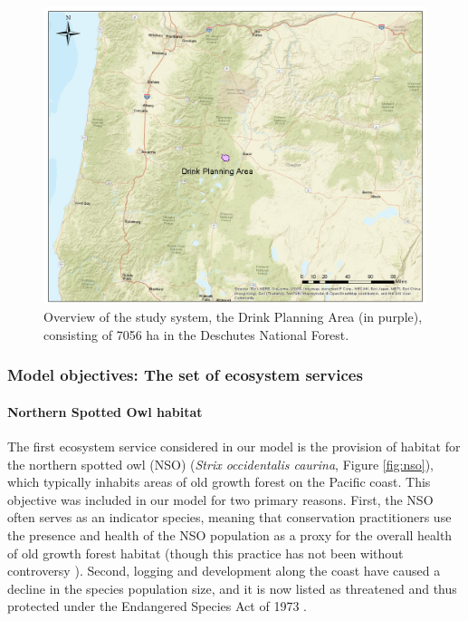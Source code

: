 \begin{figure}[ht]
\centering
\includegraphics[width=.85\textwidth]{../images/DrinkMap_Overview}
\caption[Overview of the study system, the Drink Planning Area]{Overview of the study system, the Drink Planning Area (in purple), consisting of 7056 ha in the Deschutes National Forest.}
\label{fig:drinkOverview}
\end{figure}

\subsubsection{Model objectives: The set of ecosystem services}
\paragraph{Northern Spotted Owl habitat}
The first ecosystem service considered in our model is the provision of habitat for the northern spotted owl (NSO) (\textit{Strix occidentalis caurina}, Figure \ref{fig:nso}), which typically inhabits areas of old growth forest on the Pacific coast. This objective was included in our model for two primary reasons. First, the NSO often serves as an indicator species, meaning that conservation practitioners use the presence and health of the NSO population as a proxy for the overall health of old growth forest habitat (though this practice has not been without controversy \cite{simberloff1998flagships}). Second, logging and development along the coast have caused a decline in the species population size, and it is now listed as threatened and thus protected under the Endangered Species Act of 1973 \cite{congress1973endangered}.


